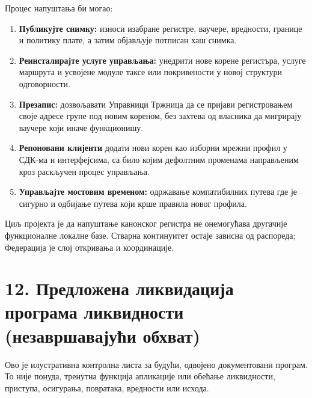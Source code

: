 \documentclass[11pt]{article}
\begin{document}
Процес напуштања би могао:

\begin{enumerate}[leftmargin=*]
\item \textbf{Публикујте снимку:} износи изабране регистре, ваучере, вредности, границе и политику плате, а затим објављује потписан хаш снимка.
\item \textbf{Реинсталирајте услуге управљања:} унедрити нове корене регистъра, услуге маршрута и усвојене модуле таксе или покривености у новој структури одговорности.
\item \textbf{Презапис:} дозвољавати Управници Тржница да се пријави регистровањем своје адресе групе под новим кореном, без захтева од власника да мигрирају ваучере који иначе функционишу.
\item \textbf{Репоновани клијенти} додати нови корен као изборни мрежни профил у СДК-ма и интерфејсима, са било којим дефолтним променама направљеним кроз раскључен процес управљања.
\item \textbf{Управљајте мостовим временом:} одржавање компатибилних путева где је сигурно и одбијање путева који крше правила новог профила.
\end{enumerate}
Циљ пројекта је да напуштање канонског регистра не онемогућава другачије функционалне локалне базе. Стварна континуитет остаје зависна од распореда; Федерација је слој откривања и координације.


\section*{12. Предложена ликвидација програма ликвидности (незавршавајући обхват)}

Ово је илустративна контролна листа за будући, одвојено документовани програм. То није понуда, тренутна функција апликације или обећање ликвидности, приступа, осигурања, повратака, вредности или исхода.
\end{document}

